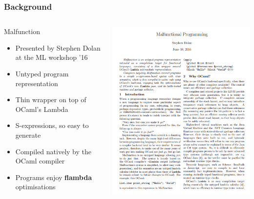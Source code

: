\documentclass[aspectratio=169]{beamer}
\begin{document}
\begin{frame}[t]
  \frametitle{Background}
  \begin{columns}[c]
    \begin{block}{Malfunction}
      \begin{itemize}
        \item Presented by Stephen Dolan at the ML workshop '16
        \item Untyped program representation
        \item Thin wrapper on top of OCaml's Lambda
        \item S-expressions, so easy to generate
        \item Compiled natively by the OCaml compiler
        \item Programs enjoy \textbf{flambda} optimisations
      \end{itemize}
    \end{block}
    \includegraphics[width=.5\textwidth]{mlfpaper.png}
  \end{columns}
\end{frame}

\end{document}
